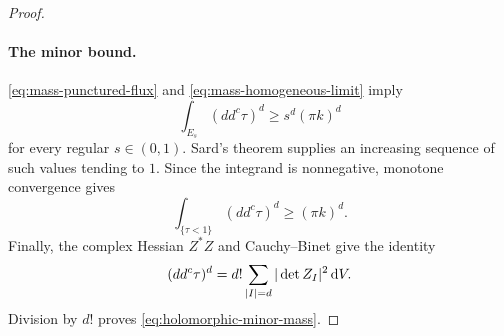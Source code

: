 \begin{proof}
\paragraph{The minor bound.}
\eqref{eq:mass-punctured-flux} and \eqref{eq:mass-homogeneous-limit} imply
\[
\int_{E_s}(dd^c\tau)^d\geq s^d(\pi k)^d
\]
for every regular $s\in(0,1)$. Sard's theorem supplies an increasing sequence of such values tending to $1$. Since the integrand is nonnegative, monotone convergence gives
\[
\int_{\{\tau<1\}}(dd^c\tau)^d\geq(\pi k)^d.
\]
Finally, the complex Hessian $Z^*Z$ and Cauchy--Binet give the identity
\[
(dd^c\tau)^d
 =d!\sum_{|I|=d}|\det Z_I|^2\,\mathrm{d} V.
\]
Division by $d!$ proves \eqref{eq:holomorphic-minor-mass}.
\end{proof}
